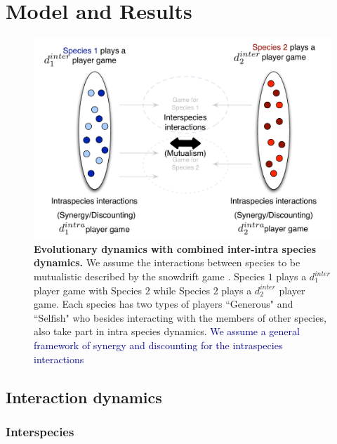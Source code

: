 \documentclass[12pt]{article}
\newcommand{\cha}[1]{\textcolor{darkblue}{#1}}
\begin{document}
\section{Model and Results}


\begin{figure}
\begin{center}
\includegraphics[width=\columnwidth]{../Figures/interintra.pdf}
\caption{\small{
\textbf{Evolutionary dynamics with combined inter-intra species dynamics.}
We assume the interactions between species to be mutualistic described by the snowdrift game \citep{bergstrom:PNAS:2003,souza:JTB:2009,gokhale:PRSB:2012}.
Species $1$ plays a $d_1^{inter}$ player game with Species $2$ while Species $2$ plays a $d_2^{inter}$ player game.
Each species has two types of players ``Generous" and ``Selfish" who besides interacting with the members of other species, also take part in intra species dynamics.
\cha{We assume a general framework of synergy and discounting for the intraspecies interactions \citep{eshel:AmNat:1988,hauert:JTB:2006a}
}}
\label{fig:conceptart}
}
\end{center}
\end{figure}


\subsection{Interaction dynamics}
\subsubsection{Interspecies}
\end{document}
